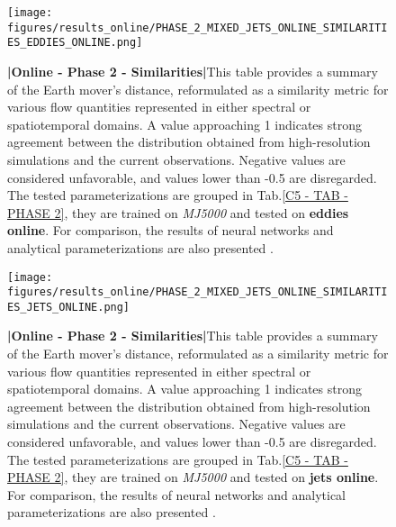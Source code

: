 %
%
\newpage

\begin{figure}[H]
    \centering
    \texttt{[image: figures/results\_online/PHASE\_2\_MIXED\_JETS\_ONLINE\_SIMILARITIES\_EDDIES\_ONLINE.png]}
    \caption{\textbf{|}\textcolor{section_color}{\textbf{Online - Phase 2 - Similarities}}\textbf{|}This table provides a summary of the Earth mover's distance, reformulated as a similarity metric for various flow quantities represented in either spectral or spatiotemporal domains. A value approaching 1 indicates strong agreement between the distribution obtained from high-resolution simulations and the current observations. Negative values are considered unfavorable, and values lower than -0.5 are disregarded. The tested parameterizations are grouped in Tab.\ref{C5 - TAB - PHASE 2}, they are trained on \textit{MJ5000} and tested on \textbf{eddies online}. For comparison, the results of neural networks \citep{Benchmarking} and analytical parameterizations are also presented \citep{ClosureAnalytical2, ClosureAnalytical51, ClosureDataDrivenZanna}.}
    \label{APP - ONLINE - PHASE 2 - SIMILARITIES -  JETS MIXED 5000 and EDDIES ONLINE}
\end{figure}

\newpage

\begin{figure}[H]
    \centering
    \texttt{[image: figures/results\_online/PHASE\_2\_MIXED\_JETS\_ONLINE\_SIMILARITIES\_JETS\_ONLINE.png]}
    \caption{\textbf{|}\textcolor{section_color}{\textbf{Online - Phase 2 - Similarities}}\textbf{|}This table provides a summary of the Earth mover's distance, reformulated as a similarity metric for various flow quantities represented in either spectral or spatiotemporal domains. A value approaching 1 indicates strong agreement between the distribution obtained from high-resolution simulations and the current observations. Negative values are considered unfavorable, and values lower than -0.5 are disregarded. The tested parameterizations are grouped in Tab.\ref{C5 - TAB - PHASE 2}, they are trained on \textit{MJ5000} and tested on \textbf{jets online}. For comparison, the results of neural networks \citep{Benchmarking} and analytical parameterizations are also presented \citep{ClosureAnalytical2, ClosureAnalytical51, ClosureDataDrivenZanna}.}
    \label{APP - ONLINE - PHASE 2 - SIMILARITIES -  JETS MIXED 5000 and JETS ONLINE}
\end{figure}

